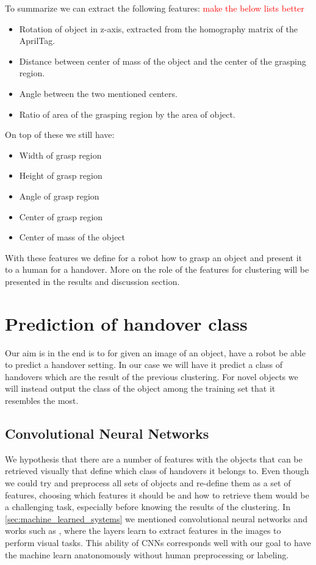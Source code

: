 To summarize we can extract the following features: \textcolor{red}{make the below lists better}
\begin{itemize}
	\item Rotation of object in z-axis, extracted from the homography matrix of the AprilTag.
	\item Distance between center of mass of the object and the center of the grasping region.
	\item Angle between the two mentioned centers.
	\item Ratio of area of the grasping region by the area of object.
\end{itemize}

On top of these we still have:
\begin{itemize}
	\item Width of grasp region
	\item Height of grasp region
	\item Angle of grasp region
	\item Center of grasp region
	\item Center of mass of the object
\end{itemize}

With these features we define for a robot how to grasp an object and present it to a human for a handover. More on the role of the features for clustering will be presented in the results and discussion section.


\section{Prediction of handover class}

Our aim is in the end is to for given an image of an object, have a robot be able to predict a handover setting. In our case we will have it predict a class of handovers which are the result of the previous clustering. For novel objects we will instead output the class of the object among the training set that it resembles the most.

\subsection{Convolutional Neural Networks}

We hypothesis that there are a number of features with the objects that can be retrieved visually that define which class of handovers it belongs to. Even though we could try and preprocess all sets of objects and re-define them as a set of features, choosing which features it should be and how to retrieve them would be a challenging task, especially before knowing the results of the clustering. In \ref{sec:machine_learned_systems} we mentioned convolutional neural networks and works such as \parencite{Lee2009}, \parencite{Turaga2010} where the layers learn to extract features in the images to perform visual tasks. This ability of CNNs corresponds well with our goal to have the machine learn anatonomously without human preprocessing or labeling.


